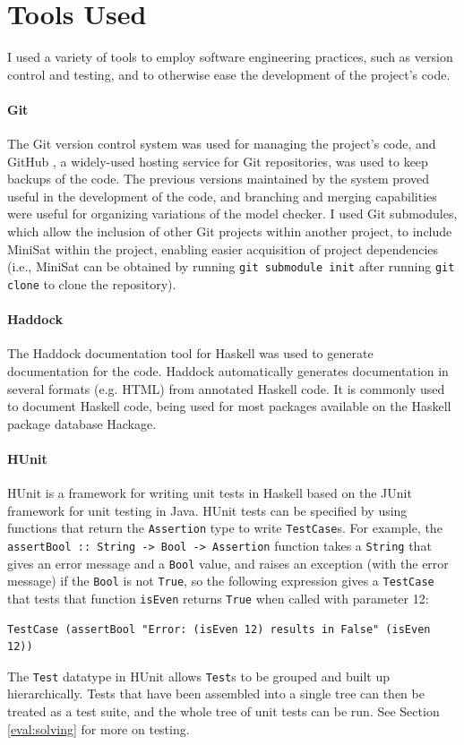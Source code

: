 \documentclass[12pt,a4paper,twoside,openright]{report}
\begin{document}
\section{Tools Used}
\label{prep:tools}

I used a variety of tools to employ software engineering practices, such
as version control and testing, and to otherwise ease the development of
the project's code.

\paragraph{Git}{
The Git version control system \cite{git}
was used for managing the project's code, and
GitHub \cite{github}, a widely-used hosting service for Git repositories, was used to
keep backups of the code.
The previous versions maintained by the system proved useful in
the development of the code, and branching and merging capabilities were
useful for organizing variations of the model checker.
I used Git submodules, which allow the inclusion of other Git projects within another
project, to include MiniSat within the project, enabling easier
acquisition of project dependencies (i.e., MiniSat can be obtained by running
\verb,git submodule init, after running \verb,git clone, to clone the repository).}

\paragraph{Haddock}{
The Haddock \cite{haddock} documentation tool for Haskell was used to generate documentation
for the code. Haddock automatically generates documentation in
several formats (e.g. HTML) from annotated Haskell code. It is commonly
used to document Haskell code, being used for most packages available
on the Haskell package database Hackage.
}

\paragraph{HUnit}{
HUnit \cite{hunit} is a framework for writing unit tests in Haskell based on the
JUnit framework \cite{junit} for unit testing in Java.
HUnit tests can be specified by using functions
that return the \verb,Assertion, type to write \verb,TestCase,s. For example, the
\verb,assertBool :: String -> Bool -> Assertion, function takes a \verb,String,
that gives an error message and a \verb,Bool, value, and raises an exception (with
the error message) if the \verb,Bool, is not \verb,True,, so the
following expression gives a \verb,TestCase, that tests that function
\verb,isEven, returns \verb,True, when called with parameter 12:
\begin{lstlisting}
TestCase (assertBool "Error: (isEven 12) results in False" (isEven 12))
\end{lstlisting}

The \verb,Test, datatype in HUnit allows \verb,Test,s to be grouped
and built up hierarchically. Tests that have been assembled into a
single tree can then be treated as a test suite, and the whole tree
of unit tests can be run. See Section \ref{eval:solving} for more on testing.}
\end{document}

